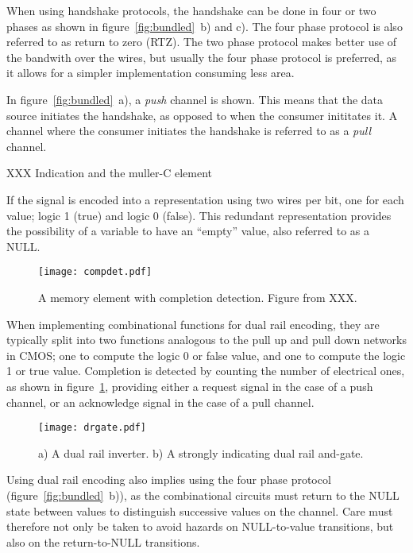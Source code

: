 When using handshake protocols, the handshake can be done in four or
two phases as shown in figure~\ref{fig:bundled}~b) and c). The four
phase protocol is also referred to as return to zero (RTZ). The two
phase protocol makes better use of the bandwith over the wires, but
usually the four phase protocol is preferred, as it allows for a
simpler implementation consuming less area.

In figure~\ref{fig:bundled}~a), a \emph{push} channel is shown. This means
that the data source initiates the handshake, as opposed to when the
consumer inititates it. A channel where the consumer initiates the
handshake is referred to as a \emph{pull} channel.

XXX Indication and the muller-C element

If the signal is encoded into a representation using two wires per
bit, one for each value; logic 1 (true) and logic 0 (false). This
redundant representation provides the possibility of a variable to
have an ``empty'' value, also referred to as a NULL. 

\begin{figure}[htbp]
  \centering
  \texttt{[image: compdet.pdf]}
  \caption{A memory element with completion detection. Figure from XXX.}
  \label{fig:compdet}
\end{figure}

When implementing combinational functions for dual rail encoding, they
are typically split into two functions analogous to the pull up and
pull down networks in CMOS; one to compute the logic 0 or false value,
and one to compute the logic 1 or true value. Completion is detected
by counting the number of electrical ones, as shown in
figure~\ref{fig:compdet}, providing either a request signal in the
case of a push channel, or an acknowledge signal in the case of a pull
channel.

\begin{figure}[htbp]
  \centering
  \texttt{[image: drgate.pdf]}
  \caption{a) A dual rail inverter. b) A strongly indicating dual rail
    and-gate.}
  \label{fig:drgate}
\end{figure}


Using dual rail encoding also implies using the four phase protocol
(figure~\ref{fig:bundled}~b)), as the combinational circuits must
return to the NULL state between values to distinguish successive
values on the channel. Care must therefore not only be taken to avoid
hazards on NULL-to-value transitions, but also on the return-to-NULL
transitions.


